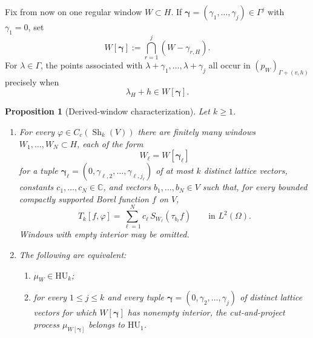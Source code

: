\documentclass[11pt,reqno,a4paper]{amsart}
\numberwithin{equation}{section}
\theoremstyle{compact}
\newtheorem{proposition}[proposition]{Proposition}
\theoremstyle{definition}
\theoremstyle{definition}
\newcommand{\HU}{\mathrm{HU}}
\newcommand{\Sh}{\operatorname{Sh}}
\begin{document}
Fix from now on one regular window \(W\subset H\).  If
\(\boldsymbol\gamma=(\gamma_1,\ldots,\gamma_j)\in\Gamma^j\) with
\(\gamma_1=0\), set
\begin{equation}\label{eq:cap-derived-window}
  W[\boldsymbol\gamma]
  :=\bigcap_{r=1}^j (W-\gamma_{r,H}).
\end{equation}
For \(\lambda\in\Gamma\), the points associated with
\(\lambda+\gamma_1,\ldots,\lambda+\gamma_j\) all occur in
\((p_W)_{\Gamma+(v,h)}\) precisely when
\begin{equation}\label{eq:cap-acceptance-condition}
  \lambda_H+h\in W[\boldsymbol\gamma].
\end{equation}
\begin{proposition}[Derived-window characterization]
\label{prop:cap-pattern-reduction}
Let $k\geq1$.
\begin{enumerate}[label=\textup{(\roman*)}]
\item For every $\varphi\in C_c(\Sh_k(V))$ there are finitely many windows
$W_1,\ldots,W_N\subset H$, each of the form
\begin{equation}\label{eq:cap-acceptance-window-form}
  W_\ell=W[\boldsymbol\gamma_\ell]
\end{equation}
for a tuple $\boldsymbol\gamma_\ell=(0,\gamma_{\ell,2},\ldots,\gamma_{\ell,j_\ell})$
of at most $k$ distinct lattice vectors, constants $c_1,\ldots,c_N\in\mathbb C$, and vectors
$b_1,\ldots,b_N\in V$ such that, for every bounded compactly supported Borel
function $f$ on $V$,
\begin{equation}\label{eq:cap-pattern-reduction}
  T_k[f,\varphi]
  =\sum_{\ell=1}^N c_\ell\,S_{W_\ell}(\tau_{b_\ell}f)
  \qquad\text{in }L^2(\Omega).
\end{equation}
Windows with empty interior may be omitted.
\item The following are equivalent:
\begin{enumerate}[label=\textup{(\alph*)}]
\item $\mu_W\in\HU_k$;
\item for every $1\leq j\leq k$ and every tuple
$\boldsymbol\gamma=(0,\gamma_2,\ldots,\gamma_j)$ of distinct lattice vectors
for which $W[\boldsymbol\gamma]$ has nonempty interior, the cut-and-project
process $\mu_{W[\boldsymbol\gamma]}$ belongs to $\HU_1$.
\end{enumerate}
\end{enumerate}
\end{proposition}
\end{document}
